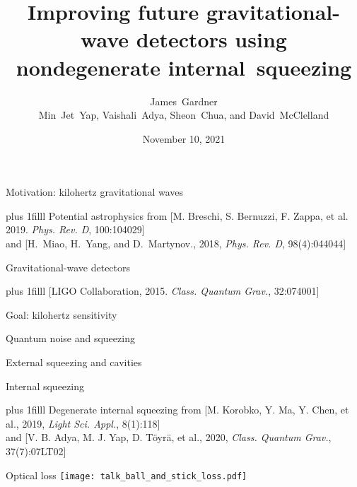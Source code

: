 \documentclass[12pt,xcolor=dvipsnames]{beamer}
\title[]{Improving future gravitational-wave detectors using nondegenerate internal~squeezing}
\author[James Gardner]{\texorpdfstring{\large{James~Gardner}\\\small{Min~Jet~Yap, Vaishali~Adya, Sheon~Chua, and David~McClelland}}{James~Gardner}}
\institute[]{\small The Centre for Gravitational Astrophysics, ANU}
\date{November 10, 2021}
\begin{document}

{
  \begin{frame}[label=titleframe,noframenumbering]
  \titlepage
  \end{frame}
}

\begin{frame}{Motivation: kilohertz gravitational waves}

\vskip0pt plus 1filll
\centering
{\tiny Potential astrophysics from [M. Breschi, S. Bernuzzi, F. Zappa, et al. 2019. \emph{Phys. Rev. D}, 100:104029]}\\
{\vspace{-0.2cm}\tiny and [H.~Miao, H.~Yang, and D.~Martynov., 2018, \emph{Phys. Rev. D}, 98(4):044044]}
\end{frame}

\begin{frame}{Gravitational-wave detectors}

\vskip0pt plus 1filll
\centering
{\tiny [LIGO Collaboration, 2015. \emph{Class. Quantum Grav.}, 32:074001]}
\end{frame}

\begin{frame}{Goal: kilohertz sensitivity}
\end{frame}

\begin{frame}{Quantum noise and squeezing}

\end{frame}

\begin{frame}{External squeezing and cavities}
\end{frame}

\begin{frame}{Internal squeezing}


\vskip0pt plus 1filll
\centering
{\tiny Degenerate internal squeezing from [M. Korobko, Y. Ma, Y. Chen, et al., 2019, \emph{Light Sci. Appl.}, 8(1):118]}\\
{\vspace{-0.2cm}\tiny and [V. B. Adya, M. J. Yap, D. Töyrä, et al., 2020, \emph{Class. Quantum Grav.}, 37(7):07LT02]}
\end{frame}

\begin{frame}{Optical loss}
\centering
{
\texttt{[image: talk\_ball\_and\_stick\_loss.pdf]}
\hspace*{1cm}
}
\end{frame}
\end{document}
